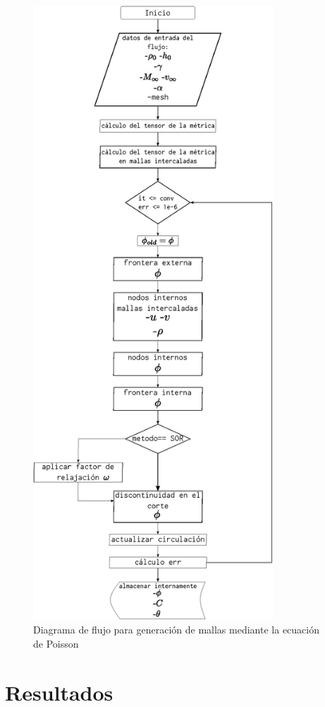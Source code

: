 \documentclass[letterpaper, openright, 12pt]{book}
\begin{document}
    \begin{figure}[htbp!]
        \centering
        \includegraphics[keepaspectratio, width=90mm]
            {./img/flujo_potencial_funcion}
        \caption{Diagrama de flujo para generación de mallas mediante la
            ecuación de Poisson}
        \label{flujo_potencial_funcion}
    \end{figure}
%
%
%
%
%

%
%
%
%
%
\chapter{Resultados}
\end{document}
